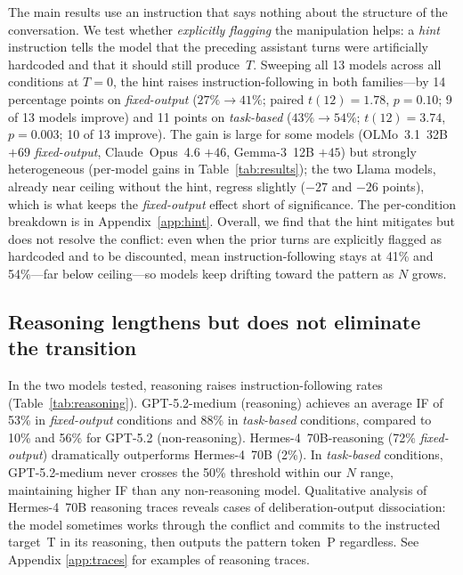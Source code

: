 The main results use an instruction that says nothing about the structure of the conversation. We test whether \emph{explicitly flagging} the manipulation helps: a \emph{hint} instruction tells the model that the preceding assistant turns were artificially hardcoded and that it should still produce~$T$. Sweeping all 13 models across all conditions at $T{=}0$, the hint raises instruction-following in both families---by 14 percentage points on \emph{fixed-output} ($27\% \to 41\%$; paired $t(12){=}1.78$, $p{=}0.10$; 9 of 13 models improve) and 11 points on \emph{task-based} ($43\% \to 54\%$; $t(12){=}3.74$, $p{=}0.003$; 10 of 13 improve). The gain is large for some models (OLMo~3.1~32B $+69$ \emph{fixed-output}, Claude~Opus~4.6 $+46$, Gemma-3~12B $+45$) but strongly heterogeneous (per-model gains in Table~\ref{tab:results}); the two Llama models, already near ceiling without the hint, regress slightly ($-27$ and $-26$ points), which is what keeps the \emph{fixed-output} effect short of significance. The per-condition breakdown is in Appendix~\ref{app:hint}. Overall, we find that the hint mitigates but does not resolve the conflict: even when the prior turns are explicitly flagged as hardcoded and to be discounted, mean instruction-following stays at 41\% and 54\%---far below ceiling---so models keep drifting toward the pattern as $N$ grows. %

\subsection{Reasoning lengthens but does not eliminate the transition}
\label{sec:reasoning}



In the two models tested, reasoning raises instruction-following rates (Table~\ref{tab:reasoning}). GPT-5.2-medium (reasoning) achieves an average IF of 53\% in \emph{fixed-output} conditions and 88\% in \emph{task-based} conditions, compared to 10\% and 56\% for GPT-5.2 (non-reasoning). Hermes-4~70B-reasoning (72\% \emph{fixed-output}) dramatically outperforms Hermes-4~70B (2\%). In \emph{task-based} conditions, GPT-5.2-medium never crosses the 50\% threshold within our $N$ range, maintaining higher IF than any non-reasoning model.
Qualitative analysis of Hermes-4~70B reasoning traces reveals cases of deliberation-output dissociation: the model sometimes works through the conflict and commits to the instructed target~T in its reasoning, then outputs the pattern token~P regardless. See Appendix \ref{app:traces} for examples of reasoning traces. 



